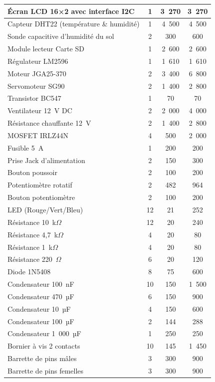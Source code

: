 \begin{longtable}{|p{7.2cm}|c|c|c|}
Écran LCD 16×2 avec interface I2C & 1 & 3~270 & 3~270 \\ \hline
Capteur DHT22 (température \& humidité) & 1 & 4~500 & 4~500 \\ \hline
Sonde capacitive d'humidité du sol & 2 & 300 & 600 \\ \hline
Module lecteur Carte SD & 1 & 2~600 & 2~600 \\ \hline
Régulateur LM2596 & 1 & 1~610 & 1~610 \\ \hline
Moteur JGA25-370 & 2 & 3~400 & 6~800 \\ \hline
Servomoteur SG90 & 2 & 1~400 & 2~800 \\ \hline
Transistor BC547 & 1 & 70 & 70 \\ \hline
Ventilateur 12~V DC & 2 & 2~000 & 4~000 \\ \hline
Résistance chauffante 12~V & 2 & 1~400 & 2~800 \\ \hline
MOSFET IRLZ44N & 4 & 500 & 2~000 \\ \hline
Fusible 5~A & 1 & 200 & 200 \\ \hline
Prise Jack d'alimentation & 2 & 150 & 300 \\ \hline
Bouton poussoir & 2 & 100 & 200 \\ \hline
Potentiomètre rotatif & 2 & 482 & 964 \\ \hline
Bouton potentiomètre & 2 & 100 & 200 \\ \hline
LED (Rouge/Vert/Bleu) & 12 & 21 & 252 \\ \hline
Résistance 10~k$\Omega$ & 12 & 20 & 240 \\ \hline
Résistance 4,7~k$\Omega$ & 4 & 20 & 80 \\ \hline
Résistance 1~k$\Omega$ & 4 & 20 & 80 \\ \hline
Résistance 220~$\Omega$ & 6 & 20 & 120 \\ \hline
Diode 1N5408 & 8 & 75 & 600 \\ \hline
Condensateur 100~nF & 10 & 150 & 1~500 \\ \hline
Condensateur 470~µF & 6 & 150 & 900 \\ \hline
Condensateur 10~µF & 4 & 150 & 600 \\ \hline
Condensateur 100~µF & 2 & 144 & 288 \\ \hline
Condensateur 1~000~µF & 1 & 250 & 250 \\ \hline
Bornier à vis 2 contacts & 10 & 145 & 1~450 \\ \hline
Barrette de pins mâles & 3 & 300 & 900 \\ \hline
Barrette de pins femelles & 3 & 300 & 900 \\ \hline

\end{longtable}
